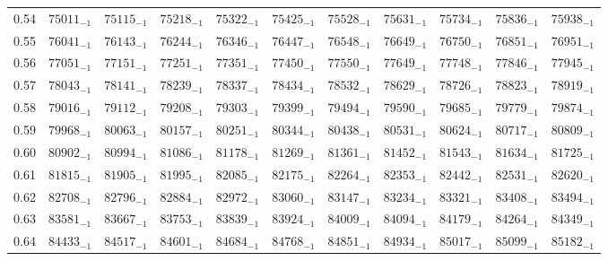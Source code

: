 \documentclass[10pt, a4paper]{article}
\begin{document}
\begin{center}
\begin{longtable}{c || c c c c c | c c c c c}
        0.54 & \({75011}_{-1}\) & \({75115}_{-1}\) & \({75218}_{-1}\) & \({75322}_{-1}\) & \({75425}_{-1}\) & \({75528}_{-1}\) & \({75631}_{-1}\) & \({75734}_{-1}\) & \({75836}_{-1}\) & \({75938}_{-1}\)\\
        0.55 & \({76041}_{-1}\) & \({76143}_{-1}\) & \({76244}_{-1}\) & \({76346}_{-1}\) & \({76447}_{-1}\) & \({76548}_{-1}\) & \({76649}_{-1}\) & \({76750}_{-1}\) & \({76851}_{-1}\) & \({76951}_{-1}\)\\
        0.56 & \({77051}_{-1}\) & \({77151}_{-1}\) & \({77251}_{-1}\) & \({77351}_{-1}\) & \({77450}_{-1}\) & \({77550}_{-1}\) & \({77649}_{-1}\) & \({77748}_{-1}\) & \({77846}_{-1}\) & \({77945}_{-1}\)\\
        0.57 & \({78043}_{-1}\) & \({78141}_{-1}\) & \({78239}_{-1}\) & \({78337}_{-1}\) & \({78434}_{-1}\) & \({78532}_{-1}\) & \({78629}_{-1}\) & \({78726}_{-1}\) & \({78823}_{-1}\) & \({78919}_{-1}\)\\
        0.58 & \({79016}_{-1}\) & \({79112}_{-1}\) & \({79208}_{-1}\) & \({79303}_{-1}\) & \({79399}_{-1}\) & \({79494}_{-1}\) & \({79590}_{-1}\) & \({79685}_{-1}\) & \({79779}_{-1}\) & \({79874}_{-1}\)\\
        0.59 & \({79968}_{-1}\) & \({80063}_{-1}\) & \({80157}_{-1}\) & \({80251}_{-1}\) & \({80344}_{-1}\) & \({80438}_{-1}\) & \({80531}_{-1}\) & \({80624}_{-1}\) & \({80717}_{-1}\) & \({80809}_{-1}\)\\
        \hline
        0.60 & \({80902}_{-1}\) & \({80994}_{-1}\) & \({81086}_{-1}\) & \({81178}_{-1}\) & \({81269}_{-1}\) & \({81361}_{-1}\) & \({81452}_{-1}\) & \({81543}_{-1}\) & \({81634}_{-1}\) & \({81725}_{-1}\)\\
        0.61 & \({81815}_{-1}\) & \({81905}_{-1}\) & \({81995}_{-1}\) & \({82085}_{-1}\) & \({82175}_{-1}\) & \({82264}_{-1}\) & \({82353}_{-1}\) & \({82442}_{-1}\) & \({82531}_{-1}\) & \({82620}_{-1}\)\\
        0.62 & \({82708}_{-1}\) & \({82796}_{-1}\) & \({82884}_{-1}\) & \({82972}_{-1}\) & \({83060}_{-1}\) & \({83147}_{-1}\) & \({83234}_{-1}\) & \({83321}_{-1}\) & \({83408}_{-1}\) & \({83494}_{-1}\)\\
        0.63 & \({83581}_{-1}\) & \({83667}_{-1}\) & \({83753}_{-1}\) & \({83839}_{-1}\) & \({83924}_{-1}\) & \({84009}_{-1}\) & \({84094}_{-1}\) & \({84179}_{-1}\) & \({84264}_{-1}\) & \({84349}_{-1}\)\\
        0.64 & \({84433}_{-1}\) & \({84517}_{-1}\) & \({84601}_{-1}\) & \({84684}_{-1}\) & \({84768}_{-1}\) & \({84851}_{-1}\) & \({84934}_{-1}\) & \({85017}_{-1}\) & \({85099}_{-1}\) & \({85182}_{-1}\)\\

\end{longtable}
\end{center}
\end{document}
